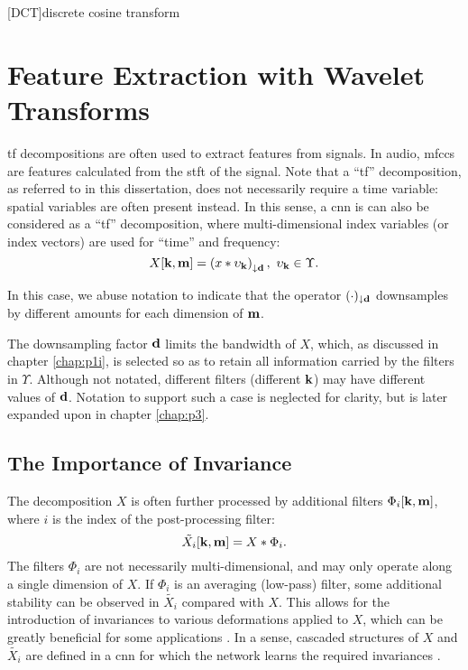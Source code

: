 [DCT]{discrete cosine transform}

\chapter{Feature Extraction with Wavelet Transforms}
\label{chap:p2i}

\ac{tf} decompositions are often used to extract features from signals. In audio, \acp{mfcc} are features calculated from the \ac{stft} of the signal. Note that a ``\ac{tf}'' decomposition, as referred to in this dissertation, does not necessarily require a time variable: spatial variables are often present instead. In this sense, a \ac{cnn} is can also be considered as a ``\ac{tf}'' decomposition, where multi-dimensional index variables (or index vectors) are used for ``time'' and frequency:
\begin{equation}
    X[\vect{k}, \vect{m}] = \left( x * \upsilon_{\vect{k}} \right)_{\downarrow \vect{d}}, \ \upsilon_{\vect{k}} \in \Upsilon.
\end{equation}

In this case, we abuse notation to indicate that the operator $(\cdot)_{\downarrow \boldsymbol{\mathbf{d}}}$ downsamples by different amounts for each dimension of $\boldsymbol{\mathbf{m}}$. 

The downsampling factor $\boldsymbol{\mathbf{d}}$ limits the bandwidth of $X$, which, as discussed in chapter \ref{chap:p1i}, is selected so as to retain all information carried by the filters in $\Upsilon$. Although not notated, different filters (different $\boldsymbol{\mathbf{k}}$) may have different values of $\boldsymbol{\mathbf{d}}$. Notation to support such a case is neglected for clarity, but is later expanded upon in chapter \ref{chap:p3}.

\section{The Importance of Invariance}

The decomposition $X$ is often further processed by additional filters $\Phi_i[\boldsymbol{\mathbf{k}}, \boldsymbol{\mathbf{m}}]$, where $i$ is the index of the post-processing filter:
\begin{equation}
    \tilde{X_i}[\boldsymbol{\mathbf{k}}, \boldsymbol{\mathbf{m}}] = X * \Phi_i.
\end{equation}
The filters $\Phi_i$ are not necessarily multi-dimensional, and may only operate along a single dimension of $X$. If $\Phi_i$ is an averaging (low-pass) filter, some additional stability can be observed in $\tilde{X_i}$ compared with $X$. This allows for the introduction of invariances to various deformations applied to $X$, which can be greatly beneficial for some applications \citep{cnninvariance}. In a sense, cascaded structures of $X$ and $\tilde{X_i}$ are defined in a \ac{cnn} for which the network learns the required invariances \cite{2dscattering}.

